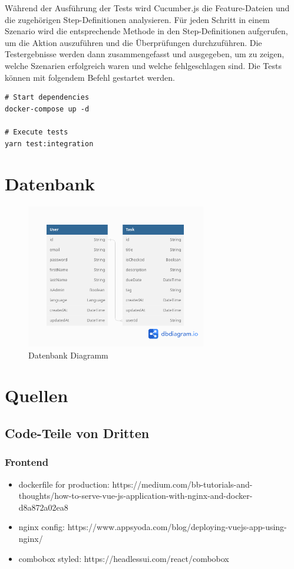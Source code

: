\documentclass[a4paper, 12pt]{article}
\begin{document}
    Während der Ausführung der Tests wird Cucumber.js die Feature-Dateien und die zugehörigen Step-Definitionen analysieren. Für jeden Schritt
    in einem Szenario wird die entsprechende Methode in den Step-Definitionen aufgerufen, um die Aktion auszuführen und die Überprüfungen
    durchzuführen. Die Testergebnisse werden dann zusammengefasst und ausgegeben, um zu zeigen, welche Szenarien erfolgreich waren und welche
    fehlgeschlagen sind. Die Tests können mit folgendem Befehl gestartet werden.

    \begin{verbatim}
# Start dependencies
docker-compose up -d

# Execute tests
yarn test:integration
    \end{verbatim}

    \section{Datenbank}
    \begin{figure}[H]
        \center\includegraphics[width=0.7\textwidth]{../images/database}
        \caption{Datenbank Diagramm}\label{fig:figure}
    \end{figure}

    \newpage
    \section{Quellen}
    \subsection{Code-Teile von Dritten}
    \subsubsection{Frontend}
\begin{itemize}
  \item dockerfile for production: https://medium.com/bb-tutorials-and-thoughts/how-to-serve-vue-js-application-with-nginx-and-docker-d8a872a02ea8
  \item nginx config: https://www.appsyoda.com/blog/deploying-vuejs-app-using-nginx/
  \item combobox styled: https://headlessui.com/react/combobox
\end{itemize}
\end{document}
